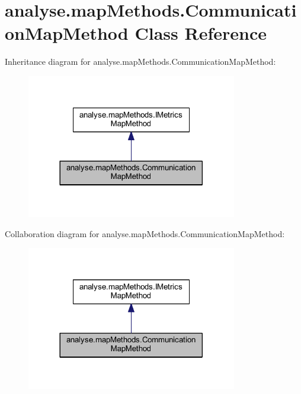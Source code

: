 \hypertarget{classanalyse_1_1map_methods_1_1_communication_map_method}{}\section{analyse.\+map\+Methods.\+Communication\+Map\+Method Class Reference}
\label{classanalyse_1_1map_methods_1_1_communication_map_method}


Inheritance diagram for analyse.\+map\+Methods.\+Communication\+Map\+Method\+:
\nopagebreak
\begin{figure}[H]
\begin{center}
\leavevmode
\includegraphics[width=260pt]{classanalyse_1_1map_methods_1_1_communication_map_method__inherit__graph}
\end{center}
\end{figure}


Collaboration diagram for analyse.\+map\+Methods.\+Communication\+Map\+Method\+:
\nopagebreak
\begin{figure}[H]
\begin{center}
\leavevmode
\includegraphics[width=260pt]{classanalyse_1_1map_methods_1_1_communication_map_method__coll__graph}
\end{center}
\end{figure}
